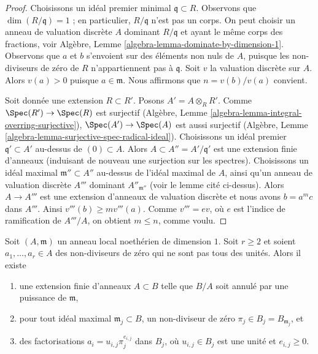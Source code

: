 \begin{proof}
Choisissons un idéal premier minimal $\mathfrak q \subset R$. Observons que
$\dim(R/\mathfrak q) = 1$ ; en particulier, $R/\mathfrak q$ n'est pas un corps.
On peut choisir un anneau de valuation discrète $A$ dominant $R/\mathfrak q$
et ayant le même corps des fractions, voir
Algèbre, Lemme \ref{algebra-lemma-dominate-by-dimension-1}. Observons que
$a$ et $b$ s'envoient sur des éléments non nuls de $A$, puisque les non-diviseurs de zéro de $R$
n'appartiennent pas à $\mathfrak q$. Soit $v$ la valuation discrète sur $A$.
Alors $v(a) > 0$ puisque $a \in \mathfrak m$.
Nous affirmons que $n = v(b)/v(a)$ convient.

\medskip\noindent
Soit donnée une extension $R \subset R'$. Posons $A' = A \otimes_R R'$.
Comme $\Spec(R') \to \Spec(R)$ est surjectif
(Algèbre, Lemme \ref{algebra-lemma-integral-overring-surjective}),
$\Spec(A') \to \Spec(A)$ est aussi surjectif
(Algèbre, Lemme \ref{algebra-lemma-surjective-spec-radical-ideal}).
Choisissons un idéal premier $\mathfrak q' \subset A'$ au-dessus de $(0) \subset A$.
Alors $A \subset A'' = A'/\mathfrak q'$ est une extension finie d'anneaux
(induisant de nouveau une surjection sur les spectres).
Choisissons un idéal maximal $\mathfrak m'' \subset A''$
au-dessus de l'idéal maximal de $A$, ainsi qu'un anneau de valuation discrète
$A'''$ dominant $A''_{\mathfrak m''}$ (voir le lemme cité ci-dessus).
Alors $A \to A'''$ est une extension d'anneaux de valuation discrète
et nous avons $b = a^m c$ dans $A'''$. Ainsi $v'''(b) \geq mv'''(a)$.
Comme $v''' = ev$, où $e$ est l'indice de ramification
de $A'''/A$, on obtient $m \leq n$, comme voulu.
\end{proof}

\begin{lemma}
\label{lemma-prepare-tame-symbol}
Soit $(A, \mathfrak m)$ un anneau local noethérien de dimension $1$.
Soit $r \geq 2$ et soient $a_1, \ldots, a_r \in A$ des non-diviseurs de zéro
qui ne sont pas tous des unités.
Alors il existe
\begin{enumerate}
\item une extension finie d'anneaux $A \subset B$ telle que
$B/A$ soit annulé par une puissance de $\mathfrak m$,
\item pour tout idéal maximal $\mathfrak m_j \subset B$,
un non-diviseur de zéro $\pi_j \in B_j = B_{\mathfrak m_j}$, et
\item des factorisations $a_i = u_{i, j} \pi_j^{e_{i, j}}$ dans $B_j$,
où $u_{i, j} \in B_j$ est une unité et $e_{i, j} \geq 0$.
\end{enumerate}
\end{lemma}

